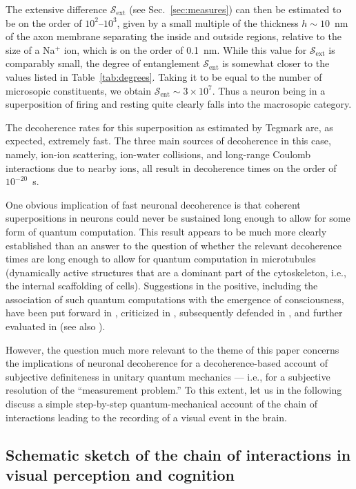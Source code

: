 \documentclass[12pt,aps,floatfix,amsmath,amssymb,showpacs,nofootinbib]{revtex4-2}
\begin{document}
The extensive difference $\mathcal{S}_\text{ext}$ (see
Sec.~\ref{sec:measures}) can then be estimated to be on the order of
$10^2$--$10^3$, given by a small multiple of the thickness $h \sim
10$~nm of the axon membrane separating the inside and outside regions,
relative to the size of a Na$^+$ ion, which is on the order of 0.1~nm.
While this value for $\mathcal{S}_\text{ext}$ is comparably small, the
degree of entanglement $\mathcal{S}_\text{ent}$ is somewhat closer to
the values listed in Table~\ref{tab:degrees}.  Taking it to be equal
to the number of microsopic constituents, we obtain
$\mathcal{S}_\text{ent} \sim 3 \times 10^7$. Thus a neuron being in a
superposition of firing and resting quite clearly falls into the
macrosopic category.

The decoherence rates for this superposition as estimated by Tegmark
are, as expected, extremely fast. The three main sources of
decoherence in this case, namely, ion-ion scattering, ion-water
collisions, and long-range Coulomb interactions due to nearby ions,
all result in decoherence times on the order of $10^{-20}$~s. 

One obvious implication of fast neuronal decoherence is that coherent
superpositions in neurons could never be sustained long enough to
allow for some form of quantum computation. This result appears to be
much more clearly established than an answer to the question of
whether the relevant decoherence times are long enough to allow for
quantum computation in microtubules (dynamically active structures
that are a dominant part of the cytoskeleton, i.e., the internal
scaffolding of cells). Suggestions in the positive, including the
association of such quantum computations with the emergence of
consciousness, have been put forward in
\cite{Penrose:1994:mm,Hameroff:1996:im,Hameroff:1996:iy},
criticized in \cite{Tegmark:2000:wz}, subsequently defended in
\cite{Hagan:2002:th}, and further evaluated in
\cite{Rosa:2004:um} (see also \cite{Stapp:2000:yy}).

However, the question much more relevant to the theme of this paper
concerns the implications of neuronal decoherence for a
decoherence-based account of subjective definiteness in unitary
quantum mechanics --- i.e., for a subjective resolution of the
``measurement problem.'' To this extent,  let us in the following
discuss a simple step-by-step quantum-mechanical account of the chain
of interactions leading to the recording of a visual event in the brain.

\subsection{Schematic sketch of the chain of interactions in visual perception
  and cognition} \label{sec:chain}
\end{document}
